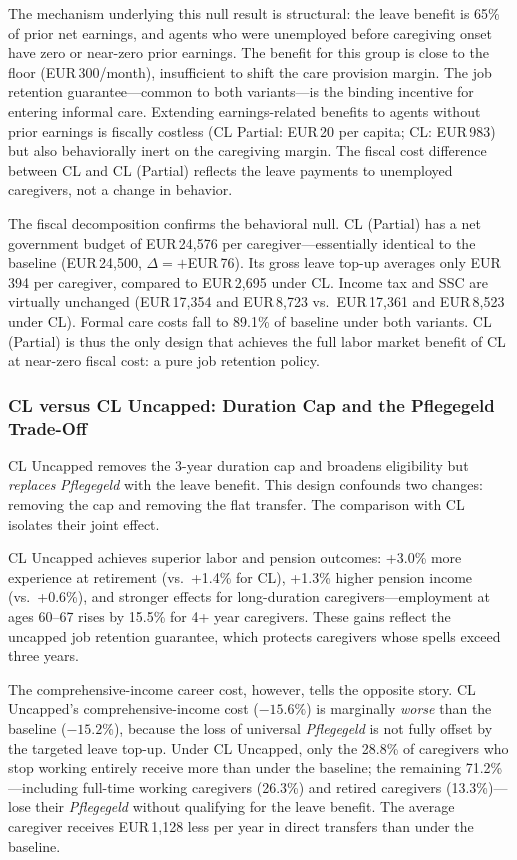 The mechanism underlying this null result is structural: the leave benefit is 65\% of prior net earnings, and agents who were unemployed before caregiving onset have zero or near-zero prior earnings. The benefit for this group is close to the floor (EUR\,300/month), insufficient to shift the care provision margin. The job retention guarantee---common to both variants---is the binding incentive for entering informal care. Extending earnings-related benefits to agents without prior earnings is fiscally costless (CL Partial: EUR\,20 per capita; CL: EUR\,983) but also behaviorally inert on the caregiving margin. The fiscal cost difference between CL and CL (Partial) reflects the leave payments to unemployed caregivers, not a change in behavior.

The fiscal decomposition confirms the behavioral null. CL (Partial) has a net government budget of EUR\,24,576 per caregiver---essentially identical to the baseline (EUR\,24,500, $\Delta = +$EUR\,76). Its gross leave top-up averages only EUR\,394 per caregiver, compared to EUR\,2,695 under CL. Income tax and SSC are virtually unchanged (EUR\,17,354 and EUR\,8,723 vs.\ EUR\,17,361 and EUR\,8,523 under CL). Formal care costs fall to 89.1\% of baseline under both variants. CL (Partial) is thus the only design that achieves the full labor market benefit of CL at near-zero fiscal cost: a pure job retention policy.

\subsubsection{CL versus CL Uncapped: Duration Cap and the Pflegegeld Trade-Off}

CL Uncapped removes the 3-year duration cap and broadens eligibility but \textit{replaces} \textit{Pflegegeld} with the leave benefit. This design confounds two changes: removing the cap and removing the flat transfer. The comparison with CL isolates their joint effect.

CL Uncapped achieves superior labor and pension outcomes: +3.0\% more experience at retirement (vs.\ +1.4\% for CL), +1.3\% higher pension income (vs.\ +0.6\%), and stronger effects for long-duration caregivers---employment at ages 60--67 rises by 15.5\% for 4+ year caregivers. These gains reflect the uncapped job retention guarantee, which protects caregivers whose spells exceed three years.

The comprehensive-income career cost, however, tells the opposite story. CL Uncapped's comprehensive-income cost ($-15.6\%$) is marginally \textit{worse} than the baseline ($-15.2\%$), because the loss of universal \textit{Pflegegeld} is not fully offset by the targeted leave top-up. Under CL Uncapped, only the 28.8\% of caregivers who stop working entirely receive more than under the baseline; the remaining 71.2\%---including full-time working caregivers (26.3\%) and retired caregivers (13.3\%)---lose their \textit{Pflegegeld} without qualifying for the leave benefit. The average caregiver receives EUR\,1,128 less per year in direct transfers than under the baseline.

